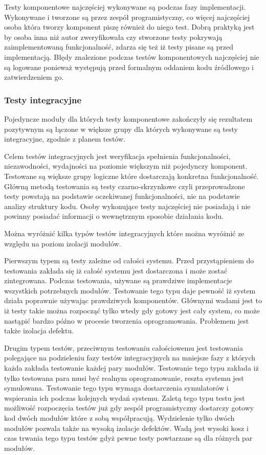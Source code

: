 Testy komponentowe najczęściej wykonywane są podczas fazy implementacji. Wykonywane i tworzone są przez zespół programistyczny, co więcej najczęściej osoba która tworzy komponent piszę również do niego test. Dobrą praktyką jest by osoba inna niż autor zweryfikowała czy stworzone testy pokrywają zaimplementowaną funkcjonalność, zdarza się też iż testy pisane są przed implementacją. Błędy znalezione podczas testów komponentowych najczęściej nie są logowane ponieważ występują przed formalnym oddaniem kodu źródłowego i zatwierdzeniem go.

\subsubsection{Testy integracyjne} 
Pojedyncze moduły dla których testy komponentowe zakończyły się rezultatem pozytywnym są łączone w większe grupy dla których wykonywane są testy integracyjne, zgodnie z planem testów.

Celem testów integracyjnych jest weryfikacja spełnienia funkcjonalności, niezawodności, wydajności na poziomie większym niż pojedynczy komponent. Testowane są większe grupy logiczne które dostarczają konkretna funkcjonalność. Główną metodą testowania są testy czarno-skrzynkowe czyli przeprowadzone testy powstają na podstawie oczekiwanej funkcjonalności, nie na podstawie analizy struktury kodu. Osoby wykonujące testy najczęściej nie posiadają i nie powinny posiadać informacji o wewnętrznym sposobie działania kodu.

Można wyróżnić kilka typów testów integracyjnych które można wyróżnić ze względu na poziom izolacji modułów.

Pierwszym typem są testy zależne od całości systemu. Przed przystąpieniem do testowania zakłada się iż całość systemu jest dostarczona i może zostać zintegrowana.  Podczas testowania, używane są prawdziwe implementacje wszystkich potrzebnych modułów. Testowanie tego typu daje pewność iż system działa poprawnie używając prawdziwych komponentów. Głównymi wadami jest to iż testy takie można rozpocząć tylko wtedy gdy gotowy jest cały system, co może nastąpić bardzo późno w procesie tworzenia oprogramowania. Problemem jest także izolacja defektu.

Drugim typem testów, przeciwnym testowaniu całościowemu jest testowania polegające na podzieleniu fazy testów integracyjnych na mniejsze fazy z których każda zakłada testowanie każdej pary modułów. Testowanie tego typu zakłada iż tylko testowana para musi być realnym oprogramowanie, reszta systemu jest symulowana. Testowanie tego typu wymaga dostarczenia symulatorów i wspierania ich podczas kolejnych wydań systemu. Zaletą tego typu testu jest możliwość rozpoczęcia testów już gdy zespół programistyczny dostarczy gotowy kod dwóch modułów które z sobą współpracują. Wydzielenie tylko dwóch modułów pozwala także na wysoką izolacje defektów. Wadą jest wysoki kosz i czas trwania tego typu testów gdyż pewne testy powtarzane są dla różnych par modułów.

